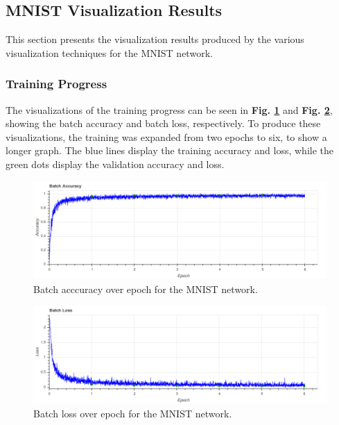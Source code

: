 \subsection{MNIST Visualization Results} \label{mnist-vis-results}

This section presents the visualization results produced by the various visualization techniques for the MNIST network.

\subsubsection{Training Progress}

The visualizations of the training progress can be seen in \textbf{Fig. \ref{mnist:accuracy}} and \textbf{Fig. \ref{mnist:loss}}, showing the batch accuracy and batch loss, respectively. To produce these visualizations, the training was expanded from two epochs to six, to show a longer graph. The blue lines display the training accuracy and loss, while the green dots display the validation accuracy and loss.


\begin{figure}
    \centering
    \includegraphics[width=1\textwidth]{fig/results/training_progress/accuracy.png}
    \caption{Batch acccuracy over epoch for the MNIST network.}
    \label{mnist:accuracy}
\end{figure}

\begin{figure}
    \centering
    \includegraphics[width=1\textwidth]{fig/results/training_progress/loss.png}
    \caption{Batch loss over epoch for the MNIST network.}
    \label{mnist:loss}
\end{figure}

